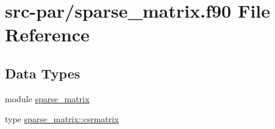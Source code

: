 \hypertarget{sparse__matrix_8f90}{\section{src-\/par/sparse\-\_\-matrix.f90 File Reference}
\label{sparse__matrix_8f90}
}
\subsection*{Data Types}
\begin{DoxyCompactItemize}
\item 
module \hyperlink{classsparse__matrix}{sparse\-\_\-matrix}
\item 
type \hyperlink{structsparse__matrix_1_1csrmatrix}{sparse\-\_\-matrix\-::csrmatrix}
\end{DoxyCompactItemize}
